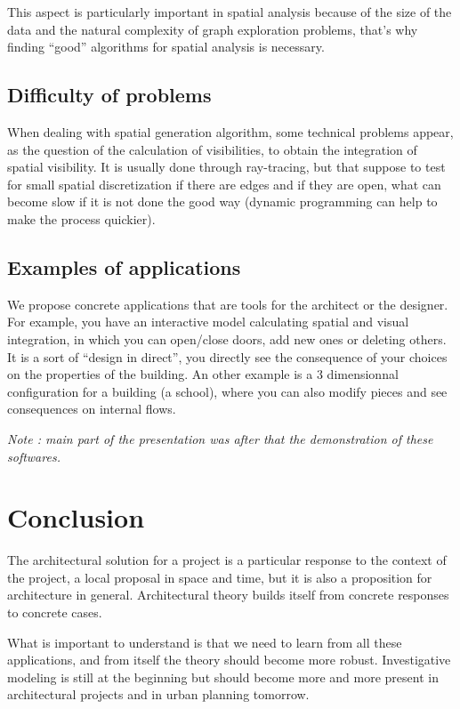 \documentclass[english]{article}
\begin{document}
\bigskip{}


This aspect is particularly important in spatial analysis because
of the size of the data and the natural complexity of graph exploration
problems, that's why finding ``good'' algorithms for spatial analysis
is necessary.


\subsection*{Difficulty of problems}

When dealing with spatial generation algorithm, some technical problems
appear, as the question of the calculation of visibilities, to obtain
the integration of spatial visibility. It is usually done through
ray-tracing, but that suppose to test for small spatial discretization
if there are edges and if they are open, what can become slow if it
is not done the good way (dynamic programming can help to make the
process quickier).


\subsection*{Examples of applications}

We propose concrete applications that are tools for the architect
or the designer. For example, you have an interactive model calculating
spatial and visual integration, in which you can open/close doors,
add new ones or deleting others. It is a sort of ``design in direct'',
you directly see the consequence of your choices on the properties
of the building. An other example is a 3 dimensionnal configuration
for a building (a school), where you can also modify pieces and see
consequences on internal flows.

\bigskip{}


\textit{Note : main part of the presentation was after that the demonstration
of these softwares.}

\newpage{}\bigskip{}
\bigskip{}



\section*{Conclusion}

\bigskip{}


The architectural solution for a project is a particular response
to the context of the project, a local proposal in space and time,
but it is also a proposition for architecture in general. Architectural
theory builds itself from concrete responses to concrete cases.\bigskip{}
\bigskip{}


What is important to understand is that we need to learn from all
these applications, and from itself the theory should become more
robust. Investigative modeling is still at the beginning but should
become more and more present in architectural projects and in urban
planning tomorrow.

\newpage{}



\end{document}
